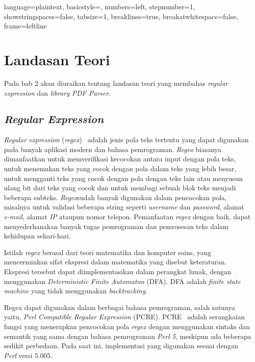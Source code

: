 
\lstset
{ 
    language=plaintext,
    basicstyle=\footnotesize,
    numbers=left,
    stepnumber=1,
    showstringspaces=false,
    tabsize=1,
    breaklines=true,
    breakatwhitespace=false,
    frame=leftline
}

\chapter{Landasan Teori}
\label{chap:teori}

Pada bab 2 akan diuraikan tentang landasan teori yang membahas \textit{regular expression} dan \textit{library PDF Parser}.

\section{\textit{Regular Expression}}
\label{sec:regex} 
 
\textit{Regular expression} (\textit{regex})~\cite{jan:12:cookbook} adalah jenis pola teks tertentu yang dapat digunakan pada banyak aplikasi modern dan bahasa pemrograman. \textit{Regex} biasanya dimanfaatkan untuk memverifikasi kecocokan antara input dengan pola teks, untuk menemukan teks yang cocok dengan pola dalam teks yang lebih besar, untuk mengganti teks yang cocok dengan pola dengan teks lain atau menyusun ulang bit dari teks yang cocok dan untuk membagi sebuah blok teks menjadi beberapa subteks. \textit{Regex}sudah banyak digunakan dalam pencocokan pola, misalnya untuk validasi beberapa string seperti \textit{username} dan \textit{password}, alamat \textit{e-mail}, alamat \textit{IP} ataupun nomor telepon. Pemanfaatan \textit{regex} dengan baik, dapat menyederhanakan banyak tugas pemrograman dan pemrosesan teks dalam kehidupan sehari-hari.

Istilah \textit{regex} berasal dari teori matematika dan komputer sains, yang mencerminkan sifat ekspresi dalam matematika yang disebut keteraturan. Ekspresi tersebut dapat diimplementasikan dalam perangkat lunak, dengan menggunakan \textit{Deterministic Finite Automaton} (DFA). DFA adalah \textit{finite state machine} yang tidak menggunakan \textit{backtracking}.

Regex dapat digunakan dalam berbagai bahasa pemrograman, salah satunya yaitu, \textit{Perl Compatible Regular Expression} (PCRE). PCRE~\cite{pcre} adalah serangkaian fungsi yang menerapkan pencocokan pola \textit{regex} dengan menggunakan sintaks dan semantik yang sama dengan bahasa pemrograman \textit{Perl 5}, meskipun ada beberapa sedikit perbedaan. Pada saat ini, implementasi yang digunakan sesuai dengan \textit{Perl} versi 5.005.

